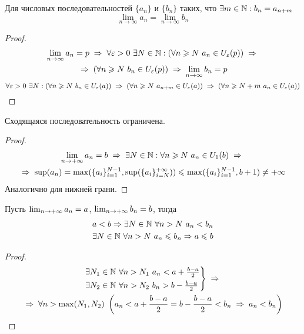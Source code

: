 \begin{theorem}
    Для числовых последовательностей $\{ a_n \}$ и $\{ b_n \}$ таких, что $ \exists m \in \mathbb{N} : b_n = a_{n + m}$
    \[ \lim_{n \to \infty} a_n = \lim_{n \to \infty} b_n \]
\end{theorem}
\begin{proof}
    \begin{multline*}
        \lim_{n \to \infty} a_n = p \thus
        \forall \epsilon > 0 \ \exists N \in \N: (\forall n \ge N\ a_n \in U_\epsilon(p)) \thus \\
        \thus (\forall n \ge N\ b_n \in U_\epsilon(p)) \thus
        \lim_{n \to \infty} b_n = p
    \end{multline*}
    \[ \forall \epsilon > 0 \ \exists N : (\forall n \ge N\ b_n \in U_\epsilon(a)) \thus (\forall n \ge N\ a_{n + m} \in U_\epsilon(a)) \thus (\forall n \ge N + m \ a_{n} \in U_\epsilon(a)) \]
\end{proof}


\begin{theorem}
    Сходящаяся последовательность ограничена.
    \label{limit_means_bounds}
\end{theorem}
\begin{proof}
    \begin{multline*}
        \limpinf a_n = b \thus
        \exists N \in \N: \forall n \ge N\ a_n \in U_1(b) \thus \\
        \thus \sup(a_n) = \max(\{a_i\}_{i=1}^{N - 1}, \sup(\{a_i\}_{i=N}^{+\infty})) \le
        \max(\{a_i\}_{i=1}^{N - 1}, b + 1) \ne +\infty
    \end{multline*}
    Аналогично для нижней грани.
\end{proof}

\begin{theorem}
    Пусть $\lim_{n\to+\infty} a_n = a$, $\lim_{n\to+\infty} b_n = b$, тогда
    \begin{gather*}
        a < b \Rightarrow \exists N \in \mathbb{N}\ \forall n > N\ a_n < b_n \\
        \exists N \in \mathbb{N}\ \forall n > N\ a_n \leqslant b_n \Rightarrow a \leqslant b
    \end{gather*}
\end{theorem}
\begin{proof}
    \begin{multline*}
        \begin{rcases}
            \exists N_1 \in \N\ \forall n > N_1\ a_n < a + \frac{b - a}{2} \\
            \exists N_2 \in \N\ \forall n > N_2\ b_n > b - \frac{b - a}{2}
        \end{rcases} \thus \\
        \thus \forall n > \max(N_1, N_2)\ \left(a_n < a + \frac{b - a}{2} = b - \frac{b - a}{2} < b_n \thus
                a_n < b_n\right)
    \end{multline*}
\end{proof}

